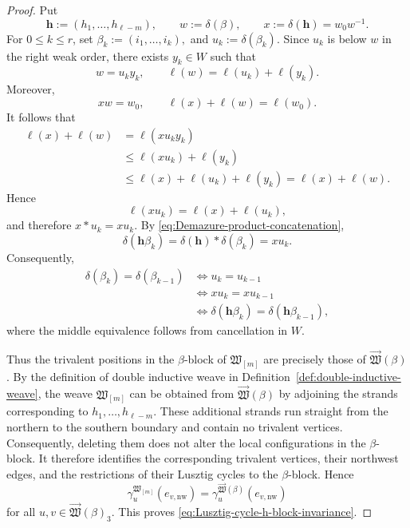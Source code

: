 \documentclass[12pt, reqno]{amsart}
\theoremstyle{plain}
\theoremstyle{definition}
\numberwithin{equation}{section}
\begin{document}
\begin{proof}
Put
\[
    \boldsymbol h:=(h_1,\ldots,h_{\ell-m}),
    \qquad
    w:=\delta(\beta),
    \qquad
    x:=\delta(\boldsymbol h)=w_0w^{-1}.
\]
For \(0\leq k\leq r\), set
\(
    \beta_k:=(i_1,\ldots,i_k),\)
    and 
    \(u_k:=\delta(\beta_k).
\)
Since \(u_k\) is below \(w\) in the right weak order, there exists
\(y_k\in W\) such that
\[
    w=u_ky_k,
    \qquad
    \ell(w)=\ell(u_k)+\ell(y_k).
\]
Moreover,
\[
    xw=w_0,
    \qquad
    \ell(x)+\ell(w)=\ell(w_0).
\]
It follows that
\[
\begin{aligned}
    \ell(x)+\ell(w)
    &=\ell(xu_ky_k)\\
    &\leq\ell(xu_k)+\ell(y_k)\\
    &\leq\ell(x)+\ell(u_k)+\ell(y_k)
     =\ell(x)+\ell(w).
\end{aligned}
\]
Hence
\[
    \ell(xu_k)=\ell(x)+\ell(u_k),
\]
and therefore \(x*u_k=xu_k\). By
\eqref{eq:Demazure-product-concatenation},
\begin{equation}\label{eq:Demazure-h-prefix}
    \delta(\boldsymbol h\beta_k)
    =
    \delta(\boldsymbol h)*\delta(\beta_k)
    =
    xu_k.
\end{equation}
Consequently,
\begin{align*}
    \delta(\beta_k)=\delta(\beta_{k-1})
    &\iff u_k=u_{k-1}\\
    &\iff xu_k=xu_{k-1}\\
    &\iff
    \delta(\boldsymbol h\beta_k)
    =
    \delta(\boldsymbol h\beta_{k-1}),
\end{align*}
where the middle equivalence follows from cancellation in \(W\).

Thus the trivalent positions in the \(\beta\)-block of
\(\mathfrak W_{[m]}\) are precisely those of
\(\overrightarrow{\mathfrak W}(\beta)\). By the definition of double inductive weave in Definition~\ref{def:double-inductive-weave}, the weave
\(\mathfrak W_{[m]}\) can be obtained from
\(\overrightarrow{\mathfrak W}(\beta)\) by adjoining the strands
corresponding to
\(h_1,\ldots,h_{\ell-m}\). These additional strands run straight from
the northern to the southern boundary and contain no trivalent
vertices. Consequently, deleting them does not alter the local configurations in the
\(\beta\)-block. It therefore identifies the corresponding trivalent
vertices, their northwest edges, and the restrictions of their
Lusztig cycles to the \(\beta\)-block. Hence
\[
    \gamma_u^{\mathfrak W_{[m]}}
        (e_{v,\mathrm{nw}})
    =
    \gamma_u^{\overrightarrow{\mathfrak W}(\beta)}
        (e_{v,\mathrm{nw}})
\]
for all
\(u,v\in\overrightarrow{\mathfrak W}(\beta)_3\). This proves
\eqref{eq:Lusztig-cycle-h-block-invariance}.
\end{proof}
\end{document}
